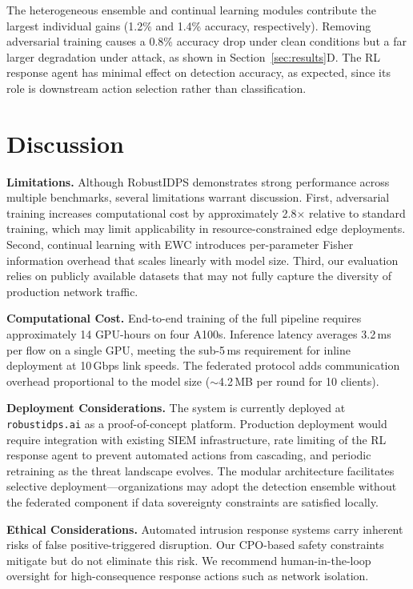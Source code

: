 The heterogeneous ensemble and continual learning modules contribute the largest individual gains (1.2\% and 1.4\% accuracy, respectively). Removing adversarial training causes a 0.8\% accuracy drop under clean conditions but a far larger degradation under attack, as shown in Section~\ref{sec:results}D. The RL response agent has minimal effect on detection accuracy, as expected, since its role is downstream action selection rather than classification.

\section{Discussion}
\label{sec:discussion}

\textbf{Limitations.} Although RobustIDPS demonstrates strong performance across multiple benchmarks, several limitations warrant discussion. First, adversarial training increases computational cost by approximately 2.8$\times$ relative to standard training, which may limit applicability in resource-constrained edge deployments. Second, continual learning with EWC introduces per-parameter Fisher information overhead that scales linearly with model size. Third, our evaluation relies on publicly available datasets that may not fully capture the diversity of production network traffic.

\textbf{Computational Cost.} End-to-end training of the full pipeline requires approximately 14 GPU-hours on four A100s. Inference latency averages 3.2\,ms per flow on a single GPU, meeting the sub-5\,ms requirement for inline deployment at 10\,Gbps link speeds. The federated protocol adds communication overhead proportional to the model size ($\sim$4.2\,MB per round for 10 clients).

\textbf{Deployment Considerations.} The system is currently deployed at \texttt{robustidps.ai} as a proof-of-concept platform. Production deployment would require integration with existing SIEM infrastructure, rate limiting of the RL response agent to prevent automated actions from cascading, and periodic retraining as the threat landscape evolves. The modular architecture facilitates selective deployment---organizations may adopt the detection ensemble without the federated component if data sovereignty constraints are satisfied locally.

\textbf{Ethical Considerations.} Automated intrusion response systems carry inherent risks of false positive-triggered disruption. Our CPO-based safety constraints mitigate but do not eliminate this risk. We recommend human-in-the-loop oversight for high-consequence response actions such as network isolation.

